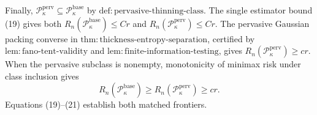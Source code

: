 Finally, \(\mathcal P_{\kappa}^{\mathrm{perv}}\subseteq\mathcal P_{\kappa}^{\mathrm{base}}\) by \(\mathrm{def:pervasive\text{-}thinning\text{-}class}\).  The single estimator bound (19) gives both \(R_n(\mathcal P_{\kappa}^{\mathrm{base}})\le Cr\) and \(R_n(\mathcal P_{\kappa}^{\mathrm{perv}})\le Cr\).  The pervasive Gaussian packing converse in \(\mathrm{thm:thickness\text{-}entropy\text{-}separation}\), certified by \(\mathrm{lem:fano\text{-}tent\text{-}validity}\) and \(\mathrm{lem:finite\text{-}information\text{-}testing}\), gives \(R_n(\mathcal P_{\kappa}^{\mathrm{perv}})\ge cr\).  When the pervasive subclass is nonempty, monotonicity of minimax risk under class inclusion gives
\[
 R_n(\mathcal P_{\kappa}^{\mathrm{base}})
 \ge R_n(\mathcal P_{\kappa}^{\mathrm{perv}})\ge cr. \tag{21}
\]
Equations (19)--(21) establish both matched frontiers.